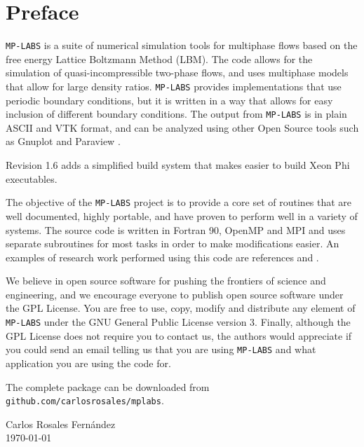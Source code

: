 \documentclass[12pt]{report}
\begin{document}
\section*{Preface}\noindent \verb+MP-LABS+ is a suite of numerical simulation tools for multiphase flows based on the free energy Lattice Boltzmann Method (LBM). The code allows for the simulation of quasi-incompressible two-phase flows, and uses multiphase models that allow for large density ratios. \verb+MP-LABS+ provides implementations that use periodic boundary conditions, but it is written in a way that allows for easy inclusion of different boundary conditions. The output from \verb+MP-LABS+ is in plain ASCII and VTK format, and can be analyzed using other Open Source tools such as Gnuplot \cite{gnuplot} and Paraview \cite{paraview}.

\noindent Revision 1.6 adds a simplified build system that makes easier to build Xeon Phi executables.

\noindent The objective of the \verb+MP-LABS+ project is to provide a core set of routines that are well documented, highly portable, and have proven to perform well in a variety of systems. The source code is written in Fortran 90, OpenMP  and MPI and uses separate subroutines for most tasks in order to make modifications easier. An examples of research work performed using this code are references \cite{Rosales2007} and \cite{Rosales2010}.

\noindent We believe in open source software for pushing the frontiers of science and engineering, and we encourage everyone to publish open source software under the GPL License. You are free to use, copy, modify and distribute any element of \verb+MP-LABS+ under the GNU General Public License version 3. Finally, although the GPL License does not require you to contact us, the authors would appreciate if you could send an email telling us that you are using \verb+MP-LABS+ and what application you are using the code for.

\noindent The complete package can be downloaded from \verb+github.com/carlosrosales/mplabs+.

\vspace{1cm}
	Carlos Rosales Fern\'andez\\
	\today

\pagebreak
\section*{}
\pagebreak
\end{document}
